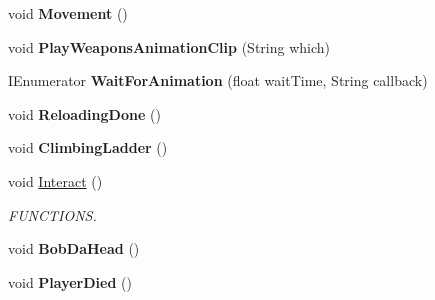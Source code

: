 \begin{DoxyCompactItemize}
\item 
\hypertarget{class_f_p_s_control_1_1_r_b_f_p_s_controller_logic_add11deade7eafcd34ccb4060e206866f}{void {\bfseries Movement} ()}\label{class_f_p_s_control_1_1_r_b_f_p_s_controller_logic_add11deade7eafcd34ccb4060e206866f}

\item 
\hypertarget{class_f_p_s_control_1_1_r_b_f_p_s_controller_logic_ad436698ecc56dae169f2fd54ef9a85c7}{void {\bfseries Play\-Weapons\-Animation\-Clip} (String which)}\label{class_f_p_s_control_1_1_r_b_f_p_s_controller_logic_ad436698ecc56dae169f2fd54ef9a85c7}

\item 
\hypertarget{class_f_p_s_control_1_1_r_b_f_p_s_controller_logic_a94187eee43a81361549200642567058a}{I\-Enumerator {\bfseries Wait\-For\-Animation} (float wait\-Time, String callback)}\label{class_f_p_s_control_1_1_r_b_f_p_s_controller_logic_a94187eee43a81361549200642567058a}

\item 
\hypertarget{class_f_p_s_control_1_1_r_b_f_p_s_controller_logic_a033adad48cc7336704daf83ddd4e8f1f}{void {\bfseries Reloading\-Done} ()}\label{class_f_p_s_control_1_1_r_b_f_p_s_controller_logic_a033adad48cc7336704daf83ddd4e8f1f}

\item 
\hypertarget{class_f_p_s_control_1_1_r_b_f_p_s_controller_logic_af36bd45c3f2e1fddb272dbc8a4aae550}{void {\bfseries Climbing\-Ladder} ()}\label{class_f_p_s_control_1_1_r_b_f_p_s_controller_logic_af36bd45c3f2e1fddb272dbc8a4aae550}

\item 
\hypertarget{class_f_p_s_control_1_1_r_b_f_p_s_controller_logic_a7c6cd54cfcd94d8823df3cbd630fa46a}{void \hyperlink{class_f_p_s_control_1_1_r_b_f_p_s_controller_logic_a7c6cd54cfcd94d8823df3cbd630fa46a}{Interact} ()}\label{class_f_p_s_control_1_1_r_b_f_p_s_controller_logic_a7c6cd54cfcd94d8823df3cbd630fa46a}

\begin{DoxyCompactList}\small\item\em F\-U\-N\-C\-T\-I\-O\-N\-S. \end{DoxyCompactList}\item 
\hypertarget{class_f_p_s_control_1_1_r_b_f_p_s_controller_logic_a36efaa9547c67208094e9c7a65e1b288}{void {\bfseries Bob\-Da\-Head} ()}\label{class_f_p_s_control_1_1_r_b_f_p_s_controller_logic_a36efaa9547c67208094e9c7a65e1b288}

\item 
\hypertarget{class_f_p_s_control_1_1_r_b_f_p_s_controller_logic_a1c671fb668cae0bccf2c97a916c0c533}{void {\bfseries Player\-Died} ()}\label{class_f_p_s_control_1_1_r_b_f_p_s_controller_logic_a1c671fb668cae0bccf2c97a916c0c533}


\end{DoxyCompactItemize}
